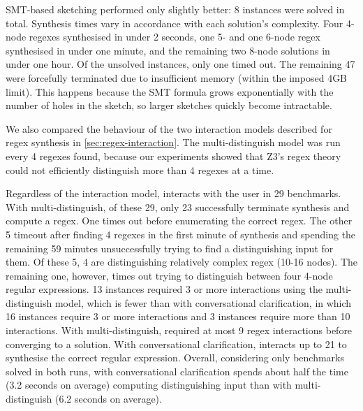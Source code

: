 \ac{SMT}-based sketching performed only slightly better: 8 instances were solved in total. Synthesis times vary in accordance with each solution's complexity. Four 4-node regexes synthesised in under 2 seconds, one 5- and one 6-node regex synthesised in under one minute, and the remaining two 8-node solutions in under one hour. Of the unsolved instances, only one timed out. The remaining 47 were forcefully terminated due to insufficient memory (within the imposed 4GB limit). This happens because the \ac{SMT} formula grows exponentially with the number of holes in the sketch, so larger sketches quickly become intractable.

We also compared the behaviour of the two interaction models described for regex synthesis in \autoref{sec:regex-interaction}.
The multi-distinguish model was run every 4 regexes found, because
our experiments showed that Z3's regex theory could not efficiently distinguish more than 4 regexes at a time. %

Regardless of the interaction model, \Forest interacts with the user in 29 benchmarks. With multi-distinguish, of these 29, only 23 successfully terminate synthesis and compute a regex. One times out before enumerating the correct regex. The other 5 timeout after finding 4 regexes in the first minute of synthesis and spending the remaining 59 minutes unsuccessfully trying to find a distinguishing input for them.
Of these 5, 4 are distinguishing relatively complex regex (10-16 nodes). The remaining one, however, times out trying to distinguish between four 4-node regular expressions.
13 instances required 3 or more interactions using the multi-distinguish model, which is fewer than with conversational clarification, in which 16 instances require 3 or more interactions and 3 instances require more than 10 interactions. With multi-distinguish, \Forest required at most 9 regex interactions before converging to a solution. With conversational clarification, \Forest interacts up to 21 to synthesise the correct regular expression.
Overall, considering only benchmarks solved in both runs, with conversational clarification \Forest spends about half the time (3.2 seconds on average) computing distinguishing input than with multi-distinguish (6.2 seconds on average).

